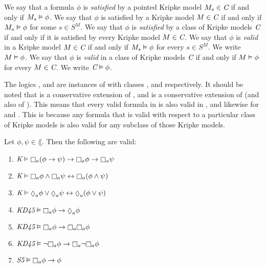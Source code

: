 We say that a formula $\phi$ is {\em satisfied} by a pointed Kripke model $M_s
\in \textit{C}$ if and only if $M_s \vDash \phi$. We say that $\phi$ is satisfied
by a Kripke model $M \in \textit{C}$ if and only if $M_s \vDash \phi$ for some $s
\in S^M$. We say that $\phi$ is {\em satisfied} by a class of Kripke models
$\textit{C}$ if and only if it is satisfied by every Kripke model $M \in \textit{C}$.
We say that $\phi$ is {\em valid} in a Kripke model $M \in \textit{C}$ if and only
if $M_s \vDash \phi$ for every $s \in S^M$. We write $M \vDash \phi$. We say
that $\phi$ is {\em valid} in a class of Kripke models $\textit{C}$ if and only if
$M \vDash \phi$ for every $M \in \textit{C}$. We write $\textit{C} \vDash \phi$.

The logics \logicK{}, \logicKD{} and \logicS{} are instances of \logicC{} with
classes \classK{}, \classKD{} and \classS{} respectively. It should be noted
that \logicKD{} is a conservative extension of \logicK{}, and \logicS{} is a
conservative extension of \logicKD{} (and also of \logicK{}). This means that
every valid formula in \logicK{} is also valid in \logicKD{}, and likewise for
\logicKD{} and \logicS{}. This is because any formula that is valid with respect
to a particular class of Kripke models is also valid for any subclass of those
Kripke models.

\begin{proposition}\label{pre-properties}
Let $\phi, \psi \in \lang$. Then the following are valid:

\begin{enumerate}
\item\label{pre-property-k} $\classK \entails \knows_a (\phi \implies \psi) \implies \knows_a \phi
\implies \knows_a \psi$
\item\label{pre-property-conj} $\classK \entails \knows_a \phi \land \knows_a \psi \iff \knows_a (\phi \land \psi)$
\item $\classK \entails \suspects_a \phi \lor \suspects_a \psi \iff \suspects_a (\phi
\lor \psi)$
\item\label{pre-property-d} $\classKD \entails \knows_a \phi \implies \suspects_a \phi$
\item\label{pre-property-4} $\classKD \entails \knows_a \phi \implies \knows_a \knows_a \phi$
\item\label{pre-property-5} $\classKD \entails \neg\knows_a \phi \implies \knows_a \neg \knows_a \phi$
\item\label{pre-property-t} $\classS \entails \knows_a \phi \implies \phi$
\end{enumerate}
\end{proposition}

